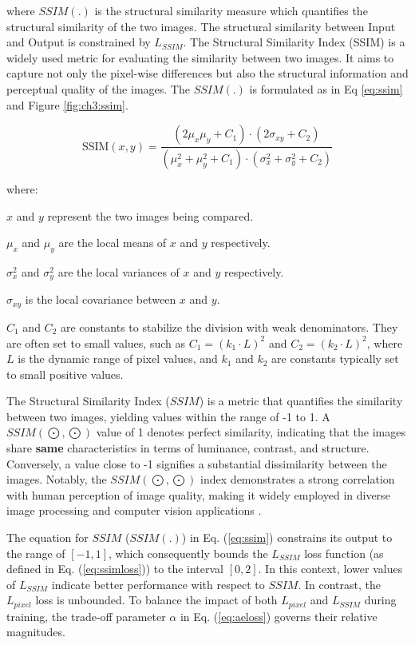 where $SSIM(.)$ is the structural similarity measure \cite{ma2015perceptual} which quantifies the structural similarity of the two images. The structural similarity between Input and Output is constrained by
$L_{SSIM}$. The Structural Similarity Index (SSIM) is a widely used metric for evaluating the similarity between two images. It aims to capture not only the pixel-wise differences but also the structural information and perceptual quality of the images. The $SSIM(.)$ is formulated as in Eq \ref{eq:ssim} and Figure \ref{fig:ch3:ssim}.

\begin{equation}\label{eq:ssim}
\text{SSIM}(x, y) = \frac{{(2\mu_x\mu_y + C_1) \cdot (2\sigma_{xy} + C_2)}}{{(\mu_x^2 + \mu_y^2 + C_1) \cdot (\sigma_x^2 + \sigma_y^2 + C_2)}}
\end{equation}

where:
\begin{list}{}{}
    \item\(x\) and \(y\) represent the two images being compared.
    \item\(\mu_x\) and \(\mu_y\) are the local means of \(x\) and \(y\) respectively.
    \item\(\sigma_x^2\) and \(\sigma_y^2\) are the local variances of \(x\) and \(y\) respectively.
    \item\(\sigma_{xy}\) is the local covariance between \(x\) and \(y\).
    \item\(C_1\) and \(C_2\) are constants to stabilize the division with weak denominators. They are often set to small values, such as \(C_1 = (k_1 \cdot L)^2\) and \(C_2 = (k_2 \cdot L)^2\), where \(L\) is the dynamic range of pixel values, and \(k_1\) and \(k_2\) are constants typically set to small positive values.
\end{list}

The Structural Similarity Index ($SSIM$) is a metric that quantifies the similarity between two images, yielding values within the range of -1 to 1. A $SSIM(\bigodot,\bigodot)$ value of 1 denotes perfect similarity, indicating that the images share \textbf{same} characteristics in terms of luminance, contrast, and structure. Conversely, a value close to -1 signifies a substantial dissimilarity between the images. Notably, the $SSIM(\bigodot,\bigodot)$ index demonstrates a strong correlation with human perception of image quality, making it widely employed in diverse image processing and computer vision applications \cite{ma2015perceptual}.

The equation for $SSIM$ ($SSIM(.)$) in Eq. (\ref{eq:ssim}) constrains its output to the range of $[-1,1]$, which consequently bounds the $L_{SSIM}$ loss function (as defined in Eq. (\ref{eq:ssimloss})) to the interval $[0,2]$. In this context, lower values of $L_{SSIM}$ indicate better performance with respect to $SSIM$. In contrast, the $L_{pixel}$ loss is unbounded. To balance the impact of both $L_{pixel}$ and $L_{SSIM}$ during training, the trade-off parameter $\alpha$ in Eq. (\ref{eq:aeloss}) governs their relative magnitudes.

